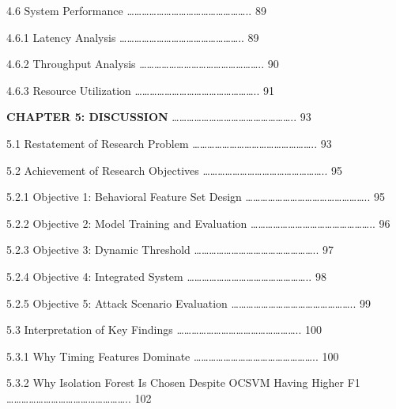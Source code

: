 \documentclass[
  a4paper]{report}
\begin{document}
4.6 System Performance
\ldots\ldots\ldots\ldots\ldots\ldots\ldots\ldots\ldots\ldots\ldots\ldots\ldots\ldots\ldots\ldots..
89

4.6.1 Latency Analysis
\ldots\ldots\ldots\ldots\ldots\ldots\ldots\ldots\ldots\ldots\ldots\ldots\ldots\ldots\ldots\ldots..
89

4.6.2 Throughput Analysis
\ldots\ldots\ldots\ldots\ldots\ldots\ldots\ldots\ldots\ldots\ldots\ldots\ldots\ldots\ldots\ldots..
90

4.6.3 Resource Utilization
\ldots\ldots\ldots\ldots\ldots\ldots\ldots\ldots\ldots\ldots\ldots\ldots\ldots\ldots\ldots\ldots..
91

\textbf{CHAPTER 5: DISCUSSION}
\ldots\ldots\ldots\ldots\ldots\ldots\ldots\ldots\ldots\ldots\ldots\ldots\ldots\ldots\ldots\ldots..
93

5.1 Restatement of Research Problem
\ldots\ldots\ldots\ldots\ldots\ldots\ldots\ldots\ldots\ldots\ldots\ldots\ldots\ldots\ldots\ldots..
93

5.2 Achievement of Research Objectives
\ldots\ldots\ldots\ldots\ldots\ldots\ldots\ldots\ldots\ldots\ldots\ldots\ldots\ldots\ldots\ldots..
95

5.2.1 Objective 1: Behavioral Feature Set Design
\ldots\ldots\ldots\ldots\ldots\ldots\ldots\ldots\ldots\ldots\ldots\ldots\ldots\ldots\ldots\ldots..
95

5.2.2 Objective 2: Model Training and Evaluation
\ldots\ldots\ldots\ldots\ldots\ldots\ldots\ldots\ldots\ldots\ldots\ldots\ldots\ldots\ldots\ldots..
96

5.2.3 Objective 3: Dynamic Threshold
\ldots\ldots\ldots\ldots\ldots\ldots\ldots\ldots\ldots\ldots\ldots\ldots\ldots\ldots\ldots\ldots..
97

5.2.4 Objective 4: Integrated System
\ldots\ldots\ldots\ldots\ldots\ldots\ldots\ldots\ldots\ldots\ldots\ldots\ldots\ldots\ldots\ldots..
98

5.2.5 Objective 5: Attack Scenario Evaluation
\ldots\ldots\ldots\ldots\ldots\ldots\ldots\ldots\ldots\ldots\ldots\ldots\ldots\ldots\ldots\ldots..
99

5.3 Interpretation of Key Findings
\ldots\ldots\ldots\ldots\ldots\ldots\ldots\ldots\ldots\ldots\ldots\ldots\ldots\ldots\ldots\ldots..
100

5.3.1 Why Timing Features Dominate
\ldots\ldots\ldots\ldots\ldots\ldots\ldots\ldots\ldots\ldots\ldots\ldots\ldots\ldots\ldots\ldots..
100

5.3.2 Why Isolation Forest Is Chosen Despite OCSVM Having Higher F1
\ldots\ldots\ldots\ldots\ldots\ldots\ldots\ldots\ldots\ldots\ldots\ldots\ldots\ldots\ldots\ldots..
102
\end{document}
